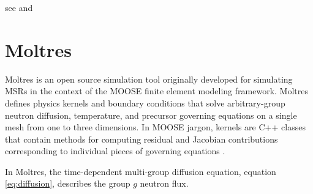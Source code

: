 \documentclass{anstrans}
\begin{document}
see \cite{oecd_nea_coupled_2019} and \cite{strydom_inl_2013}


\section{Moltres}

Moltres is an open source simulation tool originally developed for simulating \glspl{MSR} in the context of the \gls{MOOSE} finite element modeling framework.
Moltres defines physics kernels and boundary conditions that solve arbitrary-group neutron diffusion, temperature, and precursor governing equations on a single mesh from one to three dimensions.
In \gls{MOOSE} jargon, kernels are C++ classes that contain methods for computing residual and Jacobian contributions corresponding to individual pieces of governing equations \cite{lindsay_introduction_2018}.

In Moltres, the time-dependent multi-group diffusion equation, equation \ref{eq:diffusion}, describes the group $g$ neutron flux.
\end{document}
